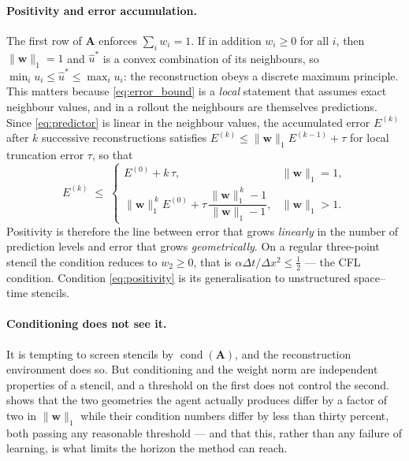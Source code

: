 \paragraph{Positivity and error accumulation.}
The first row of $\mathbf{A}$ enforces $\sum_i w_i = 1$. If in addition
$w_i \ge 0$ for all $i$, then $\|\mathbf{w}\|_1 = 1$ and $\hat{u}^{*}$ is a
convex combination of its neighbours, so
$\min_i u_i \le \hat{u}^{*} \le \max_i u_i$: the reconstruction obeys a
discrete maximum principle. This matters because \eqref{eq:error_bound} is a
\emph{local} statement that assumes exact neighbour values, and in a rollout
the neighbours are themselves predictions. Since \eqref{eq:predictor} is linear
in the neighbour values, the accumulated error $E^{(k)}$ after $k$ successive
reconstructions satisfies $E^{(k)} \le \|\mathbf{w}\|_1 E^{(k-1)} + \tau$ for
local truncation error $\tau$, so that
%
\begin{equation}
  E^{(k)} \;\le\;
  \begin{cases}
    E^{(0)} + k\,\tau, & \|\mathbf{w}\|_1 = 1,\\[4pt]
    \|\mathbf{w}\|_1^{\,k}E^{(0)}
      + \tau\,\dfrac{\|\mathbf{w}\|_1^{\,k}-1}{\|\mathbf{w}\|_1-1},
      & \|\mathbf{w}\|_1 > 1.
  \end{cases}
  \label{eq:accumulation}
\end{equation}
%
Positivity is therefore the line between error that grows \emph{linearly} in
the number of prediction levels and error that grows \emph{geometrically}. On
a regular three-point stencil the condition reduces to $w_2 \ge 0$, that is
$\alpha\Delta t/\Delta x^{2} \le \tfrac12$ --- the CFL condition. Condition
\eqref{eq:positivity} is its generalisation to unstructured space--time
stencils.

\paragraph{Conditioning does not see it.}
It is tempting to screen stencils by $\operatorname{cond}(\mathbf{A})$, and the
reconstruction environment does so. But conditioning and the weight norm are
independent properties of a stencil, and a threshold on the first does not
control the second.  shows that the two geometries the agent
actually produces differ by a factor of two in $\|\mathbf{w}\|_1$ while their
condition numbers differ by less than thirty percent, both passing any
reasonable threshold --- and that this, rather than any failure of learning, is
what limits the horizon the method can reach.
